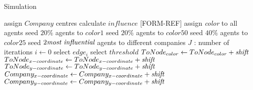 \begin{algorithm}
\caption{Simulation}
\label{alg2}
\begin{algorithmic}
\STATE assign $Company$ centres
\STATE calculate $influence$ [FORM-REF]
\STATE assign \emph{color} to all agents
\STATE seed $20\% $ agents to $color1$
\STATE seed $20\%$ agents to $color50$
\STATE seed $40\%$ agents to $color25$
\STATE seed $2 \emph{most influential}$ agents to different companies
\STATE $J$ : number of iterations
\STATE $i \gets 0$
	\STATE select $edge_i$
		\STATE select $threshold$
			\STATE $ToNode_{color} \gets ToNode_{color} + \emph{shift}$
			\STATE $ToNode_{x-coordinate} \gets ToNode_{x-coordinate} + \emph{shift}$
			\STATE $ToNode_{y-coordinate} \gets ToNode_{y-coordinate} + \emph{shift}$
			\STATE $Company_{x-coordinate} \gets Company_{x-coordinate} + \emph{shift}$
			\STATE $Company_{y-coordinate} \gets Company_{y-coordinate} + \emph{shift}$
		\ENDIF
	\ENDIF
\ENDWHILE
\end{algorithmic}
\end{algorithm}

\clearpage


